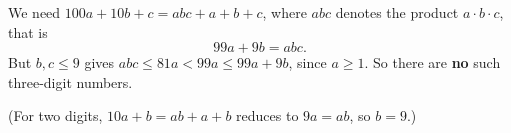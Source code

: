 We need $100a+10b+c=abc+a+b+c$, where $abc$ denotes the product $a\cdot b\cdot c$, that is
\[99a+9b=abc.\]
But $b,c\le9$ gives $abc\le81a<99a\le99a+9b$, since $a\ge1$. So there are \textbf{no} such three-digit numbers.

(For two digits, $10a+b=ab+a+b$ reduces to $9a=ab$, so $b=9$.)
